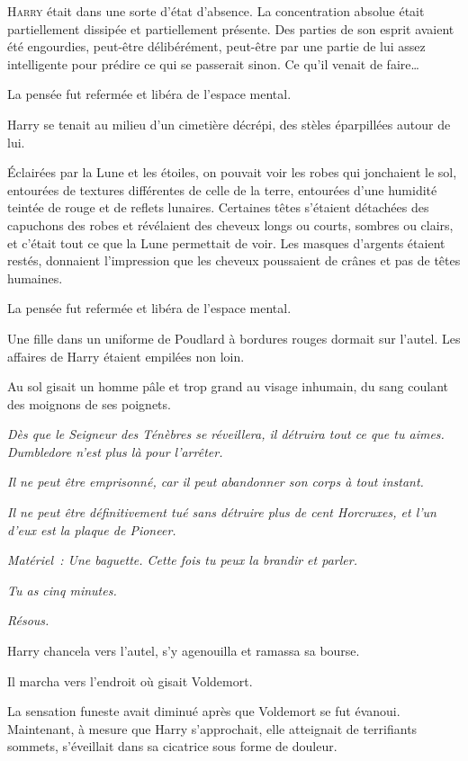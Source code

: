 
\lettrine{H}{arry} était dans une sorte d'état d'absence.
La concentration absolue était partiellement dissipée et partiellement présente.
Des parties de son esprit avaient été engourdies, peut-être délibérément, peut-être par une partie de lui assez intelligente pour prédire ce qui se passerait sinon.
Ce qu'il venait de faire…

La pensée fut refermée et libéra de l'espace mental.

Harry se tenait au milieu d'un cimetière décrépi, des stèles éparpillées autour de lui.

Éclairées par la Lune et les étoiles, on pouvait voir les robes qui jonchaient le sol, entourées de textures différentes de celle de la terre, entourées d'une humidité teintée de rouge et de reflets lunaires.
Certaines têtes s'étaient détachées des capuchons des robes et révélaient des cheveux longs ou courts, sombres ou clairs, et c'était tout ce que la Lune permettait de voir.
Les masques d'argents étaient restés, donnaient l'impression que les cheveux poussaient de crânes et pas de têtes humaines.

La pensée fut refermée et libéra de l'espace mental.

Une fille dans un uniforme de Poudlard à bordures rouges dormait sur l'autel.
Les affaires de Harry étaient empilées non loin.

Au sol gisait un homme pâle et trop grand au visage inhumain, du sang coulant des moignons de ses poignets.

\emph{Dès que le Seigneur des Ténèbres se réveillera, il détruira tout ce que tu aimes.
Dumbledore n'est plus là pour l'arrêter.}

\emph{Il ne peut être emprisonné, car il peut abandonner son corps à tout instant.}

\emph{Il ne peut être définitivement tué sans détruire plus de cent Horcruxes, et l'un d'eux est la plaque de Pioneer.}

\emph{Matériel~: Une baguette.
Cette fois tu peux la brandir et parler.}

\emph{Tu as cinq minutes.}

\emph{Résous.}

Harry chancela vers l'autel, s'y agenouilla et ramassa sa bourse.

Il marcha vers l'endroit où gisait Voldemort.

La sensation funeste avait diminué après que Voldemort se fut évanoui.
Maintenant, à mesure que Harry s'approchait, elle atteignait de terrifiants sommets, s'éveillait dans sa cicatrice sous forme de douleur.

